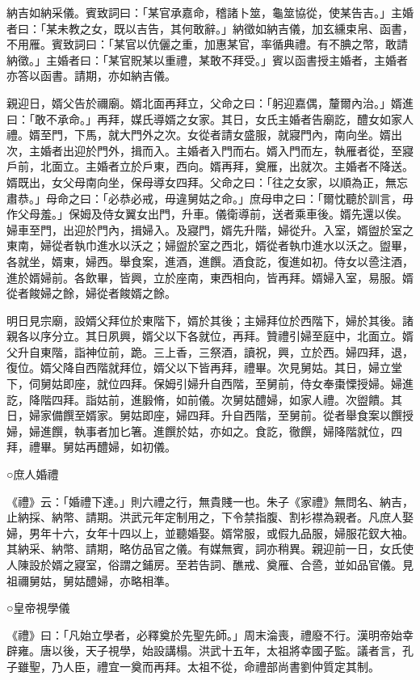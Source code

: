 納吉如納采儀。賓致詞曰：「某官承嘉命，稽諸卜筮，龜筮協從，使某告吉。」主婚者曰：「某未教之女，既以吉告，其何敢辭。」納徵如納吉儀，加玄纁束帛、函書，不用雁。賓致詞曰：「某官以伉儷之重，加惠某官，率循典禮。有不腆之幣，敢請納徵。」主婚者曰：「某官貺某以重禮，某敢不拜受。」賓以函書授主婚者，主婚者亦答以函書。請期，亦如納吉儀。

親迎日，婿父告於禰廟。婿北面再拜立，父命之曰：「躬迎嘉偶，釐爾內治。」婿進曰：「敢不承命。」再拜，媒氏導婿之女家。其日，女氏主婚者告廟訖，醴女如家人禮。婿至門，下馬，就大門外之次。女從者請女盛服，就寢門內，南向坐。婿出次，主婚者出迎於門外，揖而入。主婚者入門而右。婿入門而左，執雁者從，至寢戶前，北面立。主婚者立於戶東，西向。婿再拜，奠雁，出就次。主婚者不降送。婿既出，女父母南向坐，保母導女四拜。父命之曰：「往之女家，以順為正，無忘肅恭。」母命之曰：「必恭必戒，毋違舅姑之命。」庶母申之曰：「爾忱聽於訓言，毋作父母羞。」保姆及侍女翼女出門，升車。儀衛導前，送者乘車後。婿先還以俟。婦車至門，出迎於門內，揖婦入。及寢門，婿先升階，婦從升。入室，婿盥於室之東南，婦從者執巾進水以沃之；婦盥於室之西北，婿從者執巾進水以沃之。盥畢，各就坐，婿東，婦西。舉食案，進酒，進饌。酒食訖，復進如初。侍女以巹注酒，進於婿婦前。各飲畢，皆興，立於座南，東西相向，皆再拜。婿婦入室，易服。婿從者餕婦之餘，婦從者餕婿之餘。

明日見宗廟，設婿父拜位於東階下，婿於其後；主婦拜位於西階下，婦於其後。諸親各以序分立。其日夙興，婿父以下各就位，再拜。贊禮引婦至庭中，北面立。婿父升自東階，詣神位前，跪。三上香，三祭酒，讀祝，興，立於西。婦四拜，退，復位。婿父降自西階就拜位，婿父以下皆再拜，禮畢。次見舅姑。其日，婦立堂下，伺舅姑即座，就位四拜。保姆引婦升自西階，至舅前，侍女奉棗慄授婦。婦進訖，降階四拜。詣姑前，進腶脩，如前儀。次舅姑醴婦，如家人禮。次盥饋。其日，婦家備饌至婿家。舅姑即座，婦四拜。升自西階，至舅前。從者舉食案以饌授婦，婦進饌，執事者加匕箸。進饌於姑，亦如之。食訖，徹饌，婦降階就位，四拜，禮畢。舅姑再醴婦，如初儀。

○庶人婚禮

《禮》云：「婚禮下達。」則六禮之行，無貴賤一也。朱子《家禮》無問名、納吉，止納採、納幣、請期。洪武元年定制用之，下令禁指腹、割衫襟為親者。凡庶人娶婦，男年十六，女年十四以上，並聽婚娶。婿常服，或假九品服，婦服花釵大袖。其納采、納幣、請期，略仿品官之儀。有媒無賓，詞亦稍異。親迎前一日，女氏使人陳設於婿之寢室，俗謂之鋪房。至若告詞、醮戒、奠雁、合巹，並如品官儀。見祖禰舅姑，舅姑醴婦，亦略相準。

○皇帝視學儀

《禮》曰：「凡始立學者，必釋奠於先聖先師。」周末淪喪，禮廢不行。漢明帝始幸辟雍。唐以後，天子視學，始設講榻。洪武十五年，太祖將幸國子監。議者言，孔子雖聖，乃人臣，禮宜一奠而再拜。太祖不從，命禮部尚書劉仲質定其制。

